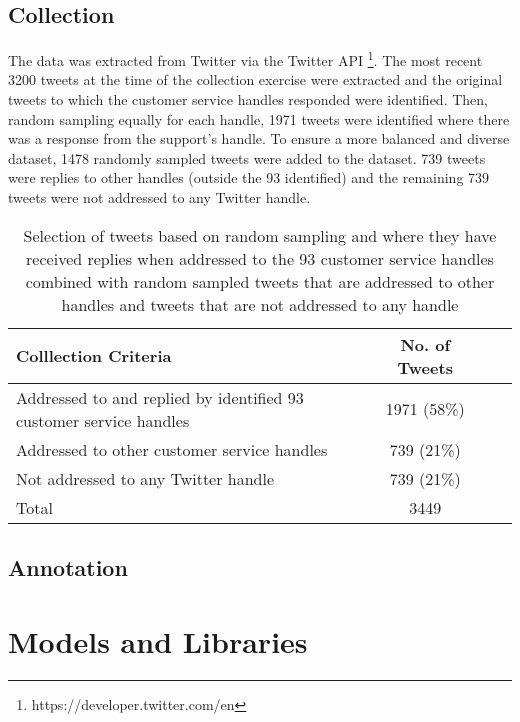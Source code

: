 \subsection{Collection}
The data was extracted from Twitter via the Twitter API \footnote{https://developer.twitter.com/en}. The most recent 3200 tweets at the time of the collection exercise were extracted and the original tweets to which the customer service handles responded were identified. Then, random sampling equally for each handle, 1971 tweets were identified where there was a response from the support's handle. To ensure a more balanced and diverse dataset, 1478 randomly sampled tweets were added to the dataset. 739 tweets were replies to other handles (outside the 93 identified) and the remaining 739 tweets were not addressed to any Twitter handle.
\begin{table}[ht]
    \centering
    \begin{tabular}{|l|c|c|c|}
    \hline
    \rowcolor[gray]{0.7}
    \textbf{Colllection Criteria} & \textbf{No. of Tweets} \\
    \hline
    Addressed to and replied by identified 93 customer service handles & 1971 (58\%) \\
    \hline
    Addressed to other customer service handles & 739 (21\%) \\
    \hline
    Not addressed to any Twitter handle & 739 (21\%) \\
    \hline    
    \rowcolor[gray]{0.9}
    Total & 3449 \\
    \hline
    \end{tabular}
    \caption{Selection of tweets based on random sampling and where they have received replies when addressed to the 93 customer service handles combined with random sampled tweets that are addressed to other handles and tweets that are not addressed to any handle}    
    \label{tab: tweet_counts}
\end{table}  

\subsection{Annotation}





\section{Models and Libraries}

